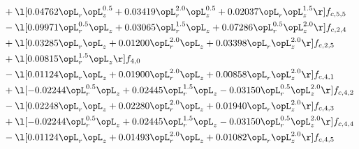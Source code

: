 \begin{alignat}{2}
& + \l[  0.04762 \opL_r \opL_z^{0.5} +  0.03419 \opL_r^{2.0} \opL_z^{0.5} +  0.02037 \opL_r \opL_z^{1.5}  \r] f_{c,5,5} \nonumber \\ 
& - \l[  0.09971 \opL_r^{0.5} \opL_z +  0.03065 \opL_r^{1.5} \opL_z +  0.07286 \opL_r^{0.5} \opL_z^{2.0}  \r] f_{c,2,4} \nonumber \\ 
& + \l[  0.03285 \opL_r \opL_z +  0.01200 \opL_r^{2.0} \opL_z +  0.03398 \opL_r \opL_z^{2.0}  \r] f_{c,2,5} \nonumber \\ 
& + \l[  0.00815 \opL_r^{1.5} \opL_z  \r] f_{4,0} \nonumber \\ 
& - \l[  0.01124 \opL_r \opL_z +  0.01900 \opL_r^{2.0} \opL_z +  0.00858 \opL_r \opL_z^{2.0}  \r] f_{c,4,1} \nonumber \\ 
& + \l[  -0.02244 \opL_r^{0.5} \opL_z +  0.02445 \opL_r^{1.5} \opL_z   -0.03150 \opL_r^{0.5} \opL_z^{2.0}  \r] f_{c,4,2} \nonumber \\ 
& - \l[  0.02248 \opL_r \opL_z +  0.02280 \opL_r^{2.0} \opL_z +  0.01940 \opL_r \opL_z^{2.0}  \r] f_{c,4,3} \nonumber \\ 
& + \l[  -0.02244 \opL_r^{0.5} \opL_z +  0.02445 \opL_r^{1.5} \opL_z   -0.03150 \opL_r^{0.5} \opL_z^{2.0}  \r] f_{c,4,4} \nonumber \\ 
& - \l[  0.01124 \opL_r \opL_z +  0.01493 \opL_r^{2.0} \opL_z +  0.01082 \opL_r \opL_z^{2.0}  \r] f_{c,4,5} \nonumber \\ 
\end{alignat} 


